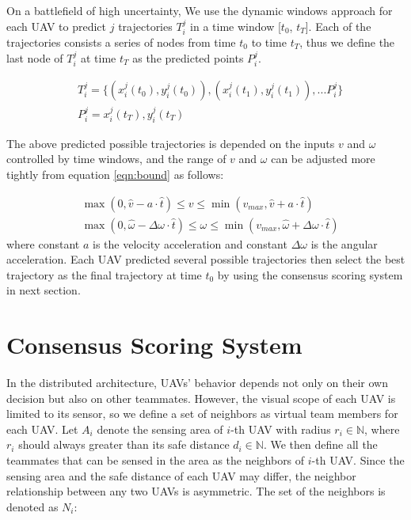 On a battlefield of high uncertainty, We use the dynamic windows approach for each UAV to predict $j$ trajectories $T^{j}_{i}$ in a time window [$t_{0}$, $t_{T}$]. Each of the trajectories consists a series of nodes from time $t_{0}$ to time $t_{T}$, thus we define the last node of $T^{j}_{i}$ at time $t_{T}$ as the predicted points $P^{j}_{i}$.

\begin{equation}
\begin{aligned}
& T^{j}_{i} = \{(x^{j}_{i}(t_{0}), y^{j}_{i}(t_{0})), (x^{j}_{i}(t_{1}), y^{j}_{i}(t_{1})),... P^{j}_{i} \} \\
& P^{j}_{i} = x^{j}_{i}(t_{T}), y^{j}_{i}(t_{T})
\end{aligned}
\end{equation}

The above predicted possible trajectories is depended on the inputs ${v}$ and ${\omega}$ controlled by time windows, and the range of ${v}$ and ${\omega}$ can be adjusted more tightly from equation \ref{eqn:bound} as follows:

\begin{equation}
\begin{aligned}
& \max(0, \hat v-a\cdot \hat{t})\leq v\leq \min(v_{max}, \hat v+a\cdot\hat{t})\\
& \max(0, \hat \omega-\Delta \omega\cdot \hat{t})\leq \omega\leq \min(v_{max}, \hat \omega+\Delta \omega\cdot \hat{t})
\end{aligned}
\end{equation}
where constant $a$ is the velocity acceleration and constant $\Delta\omega$ is the angular acceleration. Each UAV predicted several possible trajectories then select the best trajectory as the final trajectory at time $t_{0}$ by using the consensus scoring system in next section.


\section{Consensus Scoring System}
In the distributed architecture, UAVs' behavior depends not only on their own decision but also on other teammates. However, the visual scope of each UAV is limited to its sensor, so we define a set of neighbors as virtual team members for each UAV. Let $A_{i}$ denote the sensing area of $i$-th UAV with radius $r_{i}\in \mathbb{N}$, where $r_{i}$ should always greater than its safe distance $d_{i}\in \mathbb{N}$. We then define all the teammates that can be sensed in the area as the neighbors of $i$-th UAV. Since the sensing area and the safe distance of each UAV may differ, the neighbor relationship between any two UAVs is asymmetric. The set of the neighbors is denoted as $N_{i}$:

